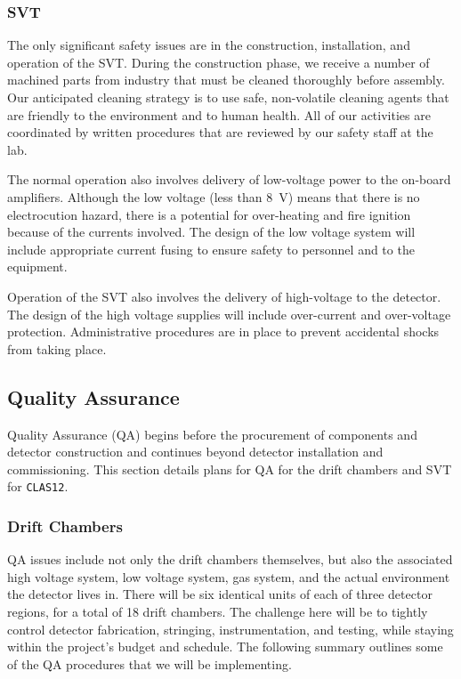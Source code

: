 \subsubsection{SVT}

The only significant safety issues are in the construction, installation, 
and operation of the SVT.  During the construction phase, we receive 
a number of machined parts from industry that must be cleaned thoroughly 
before assembly.  Our anticipated cleaning strategy is to use safe, 
non-volatile cleaning agents that are friendly to the environment and to 
human health.  All of our activities are coordinated by written 
procedures that are reviewed by our safety staff at the lab.

The normal operation also involves delivery of low-voltage power to the 
on-board amplifiers.  Although the low voltage (less than 8~V) means that 
there is no electrocution hazard, there is a potential for over-heating and 
fire ignition because of the currents involved.  The design of the
low voltage system will include appropriate current fusing to ensure
safety to personnel and to the equipment.

Operation of the SVT also involves the delivery of high-voltage to the 
detector.  The design of the high voltage supplies will include 
over-current and over-voltage protection.   Administrative procedures are 
in place to prevent accidental shocks from taking place.

\subsection{Quality Assurance}

Quality Assurance (QA) begins before the procurement of components and 
detector construction and continues beyond detector installation and 
commissioning.  This section details plans for QA for the drift chambers
and SVT for {\tt CLAS12}.

\subsubsection{Drift Chambers}

QA issues include not only the drift chambers themselves, but also the
associated high voltage system, low voltage system, gas system, and the 
actual environment the detector lives in.  There will be six identical 
units of each of three detector regions, for a total of 18 drift chambers. 
The challenge here will be to tightly control detector fabrication, 
stringing, instrumentation, and testing, while staying within the project's 
budget and schedule.  The following summary outlines some of the QA 
procedures that we will be implementing.

